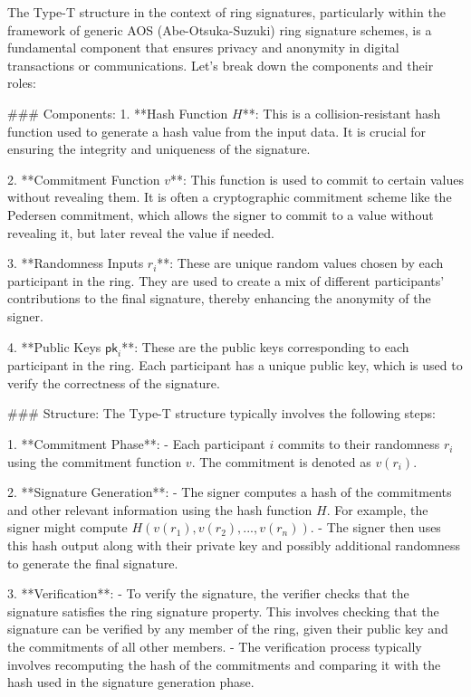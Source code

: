 The Type-T structure in the context of ring signatures, particularly within the framework of generic AOS (Abe-Otsuka-Suzuki) ring signature schemes, is a fundamental component that ensures privacy and anonymity in digital transactions or communications. Let's break down the components and their roles:

### Components:
1. **Hash Function \( H \)**: This is a collision-resistant hash function used to generate a hash value from the input data. It is crucial for ensuring the integrity and uniqueness of the signature.

2. **Commitment Function \( v \)**: This function is used to commit to certain values without revealing them. It is often a cryptographic commitment scheme like the Pedersen commitment, which allows the signer to commit to a value without revealing it, but later reveal the value if needed.

3. **Randomness Inputs \( r_i \)**: These are unique random values chosen by each participant in the ring. They are used to create a mix of different participants' contributions to the final signature, thereby enhancing the anonymity of the signer.

4. **Public Keys \( \mathsf{pk}_i \)**: These are the public keys corresponding to each participant in the ring. Each participant has a unique public key, which is used to verify the correctness of the signature.

### Structure:
The Type-T structure typically involves the following steps:

1. **Commitment Phase**:
   - Each participant \( i \) commits to their randomness \( r_i \) using the commitment function \( v \). The commitment is denoted as \( v(r_i) \).

2. **Signature Generation**:
   - The signer computes a hash of the commitments and other relevant information using the hash function \( H \). For example, the signer might compute \( H(v(r_1), v(r_2), ..., v(r_n)) \).
   - The signer then uses this hash output along with their private key and possibly additional randomness to generate the final signature.

3. **Verification**:
   - To verify the signature, the verifier checks that the signature satisfies the ring signature property. This involves checking that the signature can be verified by any member of the ring, given their public key and the commitments of all other members.
   - The verification process typically involves recomputing the hash of the commitments and comparing it with the hash used in the signature generation phase.

